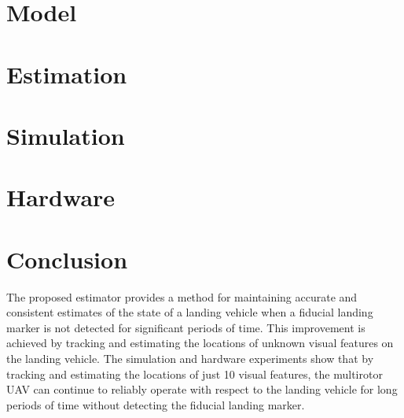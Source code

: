 \documentclass[journal]{IEEEtran}
\begin{document}
\section{Model} \label{sec:model}



% 
% 

\section{Estimation} \label{sec:estimation}




% 


\section{Simulation} \label{sec:simulation}


\section{Hardware} \label{sec:hardware}

% 






\section{Conclusion} \label{sec:conclusion}
The proposed estimator provides a method for maintaining accurate and consistent
estimates of the state of a landing vehicle when a fiducial landing marker is
not detected for significant periods of time. This improvement is achieved by
tracking and estimating the locations of unknown visual features on the landing
vehicle. The simulation and hardware experiments show that by tracking and
estimating the locations of just 10 visual features, the multirotor UAV can
continue to reliably operate with respect to the landing vehicle for long
periods of time without detecting the fiducial landing marker.






\end{document}
